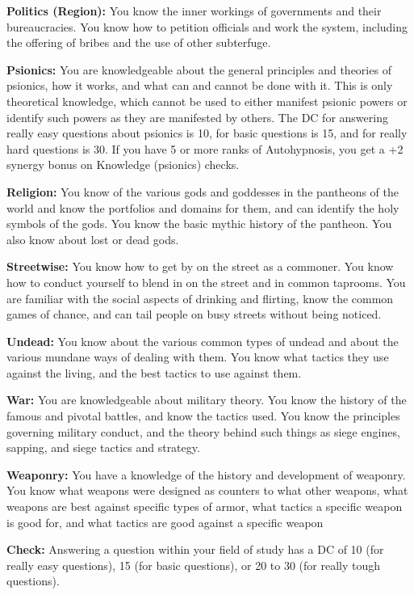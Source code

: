 \begin{itemize*}
	\item \textbf{Politics (Region):} You know the inner workings of governments and their bureaucracies. You know how to petition officials and work the system, including the offering of bribes and the use of other subterfuge.
	\item \textbf{Psionics:} You are knowledgeable about the general principles and theories of psionics, how it works, and what can and cannot be done with it. This is only theoretical knowledge, which cannot be used to either manifest psionic powers or identify such powers as they are manifested by others. The DC for answering really easy questions about psionics is 10, for basic questions is 15, and for really hard questions is 30. If you have 5 or more ranks of Autohypnosis, you get a +2 synergy bonus on Knowledge (psionics) checks.
	\item \textbf{Religion:} You know of the various gods and goddesses in the pantheons of the world and know the portfolios and domains for them, and can identify the holy symbols of the gods. You know the basic mythic history of the pantheon. You also know about lost or dead gods.
	\item \textbf{Streetwise:} You know how to get by on the street as a commoner. You know how to conduct yourself to blend in on the street and in common taprooms. You are familiar with the social aspects of drinking and flirting, know the common games of chance, and can tail people on busy streets without being noticed.
	\item \textbf{Undead:} You know about the various common types of undead and about the various mundane ways of dealing with them. You know what tactics they use against the living, and the best tactics to use against them.
	\item \textbf{War:} You are knowledgeable about military theory. You know the history of the famous and pivotal battles, and know the tactics used. You know the principles governing military conduct, and the theory behind such things as siege engines, sapping, and siege tactics and strategy.
	\item \textbf{Weaponry:} You have a knowledge of the history and development of weaponry. You know what weapons were designed as counters to what other weapons, what weapons are best against specific types of armor, what tactics a specific weapon is good for, and what tactics are good against a specific weapon
\end{itemize*}

\textbf{Check:} Answering a question within your field of study has a DC of 10 (for really easy questions), 15 (for basic questions), or 20 to 30 (for really tough questions).


